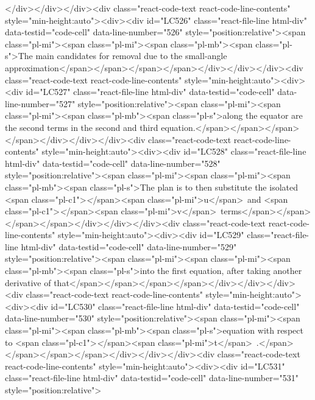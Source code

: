 {{{{{{{{</div></div></div><div class="react-code-text react-code-line-contents" style="min-height:auto"><div><div id="LC526" class="react-file-line html-div" data-testid="code-cell" data-line-number="526" style="position:relative"><span class="pl-mi"><span class="pl-mi"><span class="pl-mb"><span class="pl-s">The main candidates for removal due to the small-angle approximation</span></span></span></span></div></div></div><div class="react-code-text react-code-line-contents" style="min-height:auto"><div><div id="LC527" class="react-file-line html-div" data-testid="code-cell" data-line-number="527" style="position:relative"><span class="pl-mi"><span class="pl-mi"><span class="pl-mb"><span class="pl-s">along the equator are the second terms in the second and third equation.</span></span></span></span></div></div></div><div class="react-code-text react-code-line-contents" style="min-height:auto"><div><div id="LC528" class="react-file-line html-div" data-testid="code-cell" data-line-number="528" style="position:relative"><span class="pl-mi"><span class="pl-mi"><span class="pl-mb"><span class="pl-s">The plan is to then substitute the isolated <span class="pl-c1">\emph</span>{<span class="pl-mi">u</span>}~and <span class="pl-c1">\emph</span>{<span class="pl-mi">v</span>}~terms</span></span></span></span></div></div></div><div class="react-code-text react-code-line-contents" style="min-height:auto"><div><div id="LC529" class="react-file-line html-div" data-testid="code-cell" data-line-number="529" style="position:relative"><span class="pl-mi"><span class="pl-mi"><span class="pl-mb"><span class="pl-s">into the first equation, after taking another derivative of that</span></span></span></span></div></div></div><div class="react-code-text react-code-line-contents" style="min-height:auto"><div><div id="LC530" class="react-file-line html-div" data-testid="code-cell" data-line-number="530" style="position:relative"><span class="pl-mi"><span class="pl-mi"><span class="pl-mb"><span class="pl-s">equation with respect to <span class="pl-c1">\emph</span>{<span class="pl-mi">t</span>}~.</span></span></span></span></div></div></div><div class="react-code-text react-code-line-contents" style="min-height:auto"><div><div id="LC531" class="react-file-line html-div" data-testid="code-cell" data-line-number="531" style="position:relative">
}}}}}}}}
